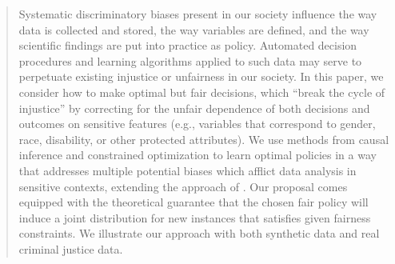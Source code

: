 \documentclass{article}
\begin{document}
\printAffiliationsAndNotice{}  %

\begin{abstract}
Systematic discriminatory biases present in our society influence the way data is collected and stored, the way variables are defined, and the way scientific findings are put into practice as policy. Automated decision procedures and learning algorithms applied to such data may serve to perpetuate existing injustice or unfairness in our society. In this paper, we consider how to make optimal but fair decisions, which ``break the cycle of injustice'' by correcting for the unfair dependence of both decisions and outcomes on sensitive features (e.g., variables that correspond to gender, race, disability, or other protected attributes). 
We use methods from causal 
inference and constrained optimization to learn optimal policies in a way that addresses 
multiple potential biases which afflict data analysis in sensitive contexts,
extending the approach of \citet{NabiShpitser18Fair}.
Our proposal comes equipped with the theoretical guarantee that the chosen fair policy will 
induce a joint distribution for new instances
that satisfies given fairness constraints.
We illustrate our approach with both synthetic data and real criminal justice data.


\end{abstract}
\end{document}
